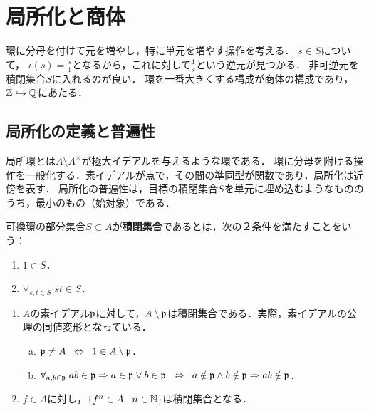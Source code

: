 \documentclass[uplatex,dvipdfmx]{jsreport}
\begin{document}
\section{局所化と商体}

\begin{tcolorbox}[colframe=ForestGreen, colback=ForestGreen!10!white,breakable,colbacktitle=ForestGreen!40!white,coltitle=black,fonttitle=\bfseries\sffamily,
title=]
    環に分母を付けて元を増やし，特に単元を増やす操作を考える．
    $s\in S$について，
    $\iota(s)=\frac{s}{1}$となるから，これに対して$\frac{1}{s}$という逆元が見つかる．
    非可逆元を積閉集合$S$に入れるのが良い．
    環を一番大きくする構成が商体の構成であり，$\mathbb{Z}\hookrightarrow\mathbb{Q}$にあたる．
\end{tcolorbox}

\subsection{局所化の定義と普遍性}

\begin{tcolorbox}[colframe=ForestGreen, colback=ForestGreen!10!white,breakable,colbacktitle=ForestGreen!40!white,coltitle=black,fonttitle=\bfseries\sffamily,
title=]
    局所環とは$A\setminus A^\times$が極大イデアルを与えるような環である．
    環に分母を附ける操作を一般化する．素イデアルが点で，その間の準同型が関数であり，局所化は近傍を表す．
    局所化の普遍性は，目標の積閉集合$S$を単元に埋め込むようなもののうち，最小のもの（始対象）である．
\end{tcolorbox}

\begin{definition}
    可換環の部分集合$S\subset A$が\textbf{積閉集合}であるとは，次の２条件を満たすことをいう：
    \begin{enumerate}
        \item $1\in S$．
        \item $\forall_{s,t\in S}\;st\in S$．
    \end{enumerate}
\end{definition}
\begin{example}\mbox{}
    \begin{enumerate}
        \item $A$の素イデアル$\mathfrak{p}$に対して，$A\setminus\mathfrak{p}$は積閉集合である．実際，素イデアルの公理の同値変形となっている．
        \begin{enumerate}[(a)]
            \item $\mathfrak{p}\ne A\;\;\Leftrightarrow\;\; 1\in A\setminus\mathfrak{p}$．
            \item $\forall_{a,b\in\mathfrak{p}}\;ab\in\mathfrak{p}\Rightarrow a\in\mathfrak{p}\lor b\in\mathfrak{p}\;\;\Leftrightarrow\;\; a\notin\mathfrak{p}\land b\notin\mathfrak{p}\Rightarrow ab\notin\mathfrak{p}$．
        \end{enumerate}
        \item $f\in A$に対し，$\left\{f^n\in A\mid n\in\mathbb{N}\right\}$は積閉集合となる．
    \end{enumerate}
\end{example}
\end{document}

